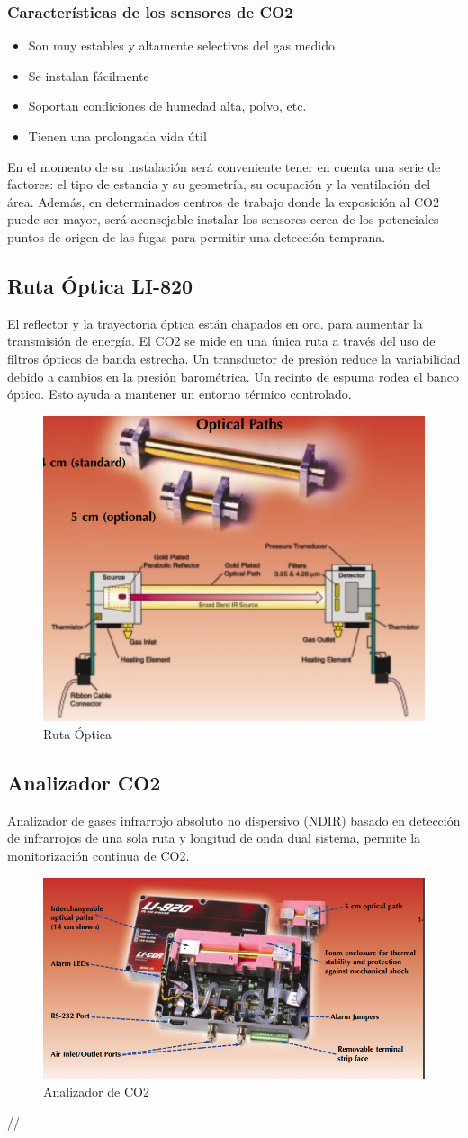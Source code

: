 \documentclass[12pt]{book}
\begin{document}
 \subsubsection{Características de los sensores de CO2}
 \begin{itemize}
 	\item Son muy estables y altamente selectivos del gas medido
 	\item Se instalan fácilmente
 	\item Soportan condiciones de humedad alta, polvo, etc.
 	\item Tienen una prolongada vida útil
 \end{itemize}
En el momento de su instalación será conveniente tener en cuenta una serie de factores: el tipo de estancia y su geometría, su ocupación y la ventilación del área. Además, en determinados centros de trabajo donde la exposición al CO2 puede ser mayor, será aconsejable instalar los sensores cerca de los potenciales puntos de origen de las fugas para permitir una detección temprana.
\newpage
\subsection{Ruta Óptica LI-820}
El reflector y la trayectoria óptica están chapados en oro. para aumentar la transmisión de energía. El CO2 se mide en una única ruta a través del uso de filtros ópticos de banda estrecha. 
Un transductor de presión reduce la variabilidad debido a cambios en la presión barométrica. Un recinto de espuma rodea el banco óptico. Esto ayuda a mantener un entorno térmico controlado.
\begin{figure}[h]
	\centering
	\includegraphics[width=0.4\linewidth]{imagenes/ruta}
	\caption[Ruta óptica LI-820 ]{Ruta Óptica}
	\label{fig:rutaoptica}
\end{figure}

 \subsection{Analizador CO2}
 Analizador de gases infrarrojo absoluto no dispersivo (NDIR) basado en detección de infrarrojos de una sola ruta y longitud de onda dual sistema, permite la monitorización continua de CO2.
 \begin{figure}[h]
 	\centering
 	\includegraphics[width=0.4\linewidth]{imagenes/analizador}
 	\caption[Analizador de CO2 LI-820 ]{Analizador de CO2 }
 	\label{fig:analizador}
 \end{figure}//
\vspace{10cm}
\end{document}
